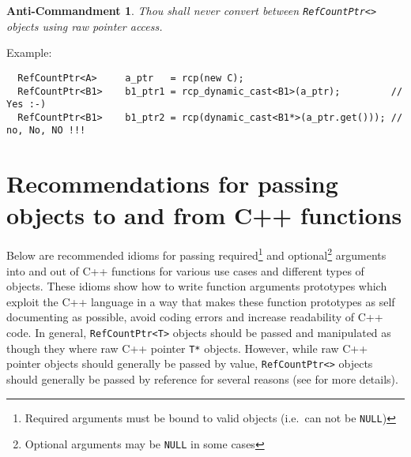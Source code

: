 \documentclass[pdf,ps2pdf,11pt]{SANDreport}
\newtheorem{anticommandment}{Anti-Commandment}
\begin{document}
\begin{anticommandment}
Thou shall never convert between {}\texttt{Ref\-Count\-Ptr<>} objects
using raw pointer access.
\end{anticommandment}

{}\noindent{}Example:
{\small\begin{verbatim}
  RefCountPtr<A>     a_ptr   = rcp(new C);
  RefCountPtr<B1>    b1_ptr1 = rcp_dynamic_cast<B1>(a_ptr);         // Yes :-)
  RefCountPtr<B1>    b1_ptr2 = rcp(dynamic_cast<B1*>(a_ptr.get())); // no, No, NO !!!
\end{verbatim}}

%
\section{Recommendations for passing objects to and from C++ functions}
\label{rcpqs:apdx:passing-args}
%

Below are recommended idioms for passing required\footnote{Required
arguments must be bound to valid objects (i.e.~can not be
{}\texttt{NULL})} and optional\footnote{Optional arguments may be
{}\texttt{NULL} in some cases} arguments into and out of C++ functions
for various use cases and different types of objects.  These idioms
show how to write function arguments prototypes which exploit the C++
language in a way that makes these function prototypes as self
documenting as possible, avoid coding errors and increase readability
of C++ code.  In general, {}\texttt{Ref\-Count\-Ptr<T>} objects should
be passed and manipulated as though they where raw C++ pointer
{}\texttt{T*} objects.  However, while raw C++ pointer objects should
generally be passed by value, {}\texttt{Ref\-Count\-Ptr<>} objects
should generally be passed by reference for several reasons (see
{}\cite{ref:RefCountPtr} for more details).
\end{document}
